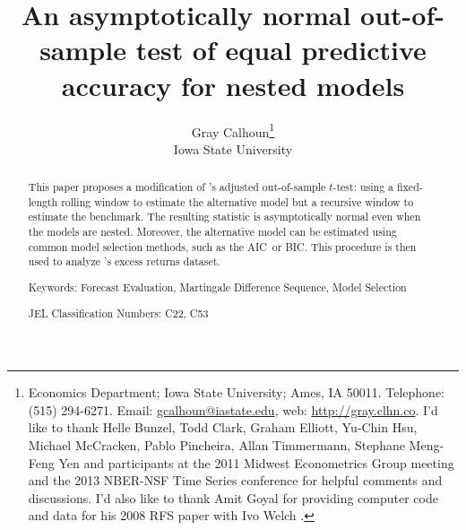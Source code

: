 \documentclass[12pt,fleqn]{article}
\newcommand\citepos[2][]{\citeauthor{#2}'s \citeyearpar[#1]{#2}}
\theoremstyle{definition}
\newcommand{\aic}{AIC}
\newcommand{\bic}{BIC}
\begin{document}
\author{Gray Calhoun\thanks{ Economics Department; Iowa State
    University; Ames, IA 50011.  Telephone: (515) 294-6271.  Email:
    \guillemotleft \protect\url{gcalhoun@iastate.edu}\guillemotright,
    web: \guillemotleft \protect\url{http://gray.clhn.co}\guillemotright.
    I'd like to
    thank Helle Bunzel, Todd Clark, Graham Elliott, Yu-Chin Hsu,
    Michael McCracken, Pablo Pincheira, Allan Timmermann, Stephane
    Meng-Feng Yen and participants at the 2011 Midwest Econometrics
    Group meeting and the 2013 NBER-NSF Time Series conference
    for helpful comments and discussions.  I'd also like to thank Amit
    Goyal for providing computer code and data for his 2008
    RFS paper with Ivo Welch \citep{GoW:08}.}\\%
  Iowa State University}

\title{An asymptotically normal out-of-sample
  test of equal predictive accuracy for nested models} 


\maketitle

\begin{abstract} 
  \noindent This paper proposes a modification of \citepos[\textit{J.
    Econom.}]{ClW:07} adjusted out-of-sample $t$-test: using a
  fixed-length rolling window to estimate the alternative model but a
  recursive window to estimate the benchmark. The
  resulting statistic is asymptotically normal even when the models
  are nested.  Moreover, the alternative model can be estimated using
  common model selection methods, such as the \aic\ or \bic.
  This procedure is then used to analyze
  \citepos[\textit{Rev. Finan. Stud.}]{GoW:08} excess returns dataset.

\strut

\noindent Keywords: Forecast Evaluation, Martingale Difference
Sequence, Model Selection

\strut

\noindent JEL Classification Numbers: C22, C53

\end{abstract}

\newpage 
\end{document}

